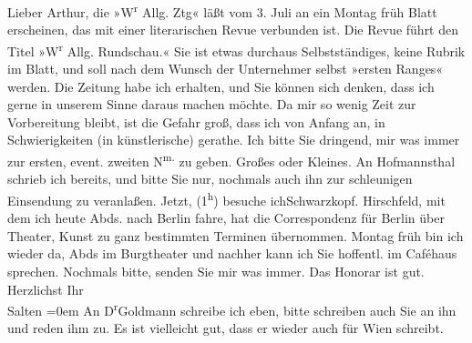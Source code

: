 \begin{ledgroupsized}[t]{13cm}
           \pstart{}Lieber Arthur,\pend\pstart
           die »W\textsuperscript{r} Allg. Ztg«
               läßt vom 3. Juli an ein Montag früh Blatt erscheinen, das mit einer
               literarischen Revue verbunden ist. Die Revue führt den Titel »W\textsuperscript{r} Allg. Rundschau.« Sie ist
               etwas durchaus Selbstständiges, keine Rubrik im Blatt, und soll nach dem Wunsch der
               Unternehmer selbst »ersten Ranges« werden. Die Zeitung habe ich erhalten, und Sie
               können sich denken, dass ich gerne in unserem Sinne daraus machen möchte. Da mir so
               wenig Zeit zur Vorbereitung bleibt, ist die Gefahr groß, dass ich von Anfang an, in
               Schwierigkeiten (in künstlerische) gerathe. Ich bitte Sie dringend, mir was immer zur
               ersten, event. zweiten N\textsuperscript{m.} zu geben. Großes oder Kleines.
               An Hofmannsthal schrieb ich bereits, und bitte
               Sie nur, nochmals auch ihn zur schleunigen Einsendung zu veranlaßen. Jetzt,
                     (1\textsuperscript{h}) besuche ichSchwarzkopf. Hirschfeld, mit dem ich heute Abds. nach Berlin fahre, hat die Correspondenz für Berlin über Theater, Kunst zu ganz bestimmten
               Terminen übernommen. \pend
           \pstart
           Montag früh bin ich wieder da, Abds im Burgtheater und nachher kann ich Sie hoffentl. im Caféhaus sprechen. \pend
           \pstart
           Nochmals bitte, senden Sie mir was immer. Das Honorar ist gut. \pend
           \pstart
           Herzlichst Ihr {\\[\baselineskip]}\spacefill\mbox{Salten}\pend
           \leftskip=0em{}\pstart
           \noindent{}An D\textsuperscript{r}Goldmann schreibe ich eben, bitte schreiben
                  auch Sie an ihn und reden ihm zu. Es ist vielleicht gut, dass er wieder auch für
                     Wien schreibt. \pend
           
         
         \endnumbering{}\end{ledgroupsized}\begin{anhang}\end{anhang}\newcommand{\dateiname}{L03293}\newcommand{\titel}{Felix Salten an Arthur Schnitzler, 21. 6. 1899}\newcommand{\editorInnen}{Martin Anton Müller und Laura Untner}
      